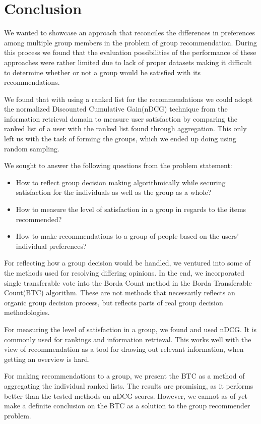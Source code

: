 \chapter{Conclusion} \label{ch:conclusion}
We wanted to showcase an approach that reconciles the differences in preferences among multiple group members in the problem of group recommendation. During this process we found that the evaluation possibilities of the performance of these approaches were rather limited due to lack of proper datasets making it difficult to determine whether or not a group would be satisfied with its recommendations.

We found that with using a ranked list for the recommendations we could adopt the normalized Discounted Cumulative Gain(nDCG) technique from the information retrieval domain to measure user satisfaction by comparing the ranked list of a user with the ranked list found through aggregation. This only left us with the task of forming the groups, which we ended up doing using random sampling.

We sought to answer the following questions from the problem statement:
\begin{itemize}
	\item How to reflect group decision making algorithmically while securing satisfaction for the individuals as well as the group as a whole?
	\item How to measure the level of satisfaction in a group in regards to the items recommended?
	\item How to make recommendations to a group of people based on the users' individual preferences?
\end{itemize}

For reflecting how a group decision would be handled, we ventured into some of the methods used for resolving differing opinions. In the end, we incorporated single transferable vote into the Borda Count method in the Borda Transferable Count(BTC) algorithm. These are not methods that necessarily reflects an organic group decision process, but reflects parts of real group decision methodologies.

For measuring the level of satisfaction in a group, we found and used nDCG. It is commonly used for rankings and information retrieval. This works well with the view of recommendation as a tool for drawing out relevant information, when getting an overview is hard.

For making recommendations to a group, we present the BTC as a method of aggregating the individual ranked lists. The results are promising, as it performs better than the tested methods on nDCG scores. However, we cannot as of yet make a definite conclusion on the BTC as a solution to the group recommender problem.
\clearpage
